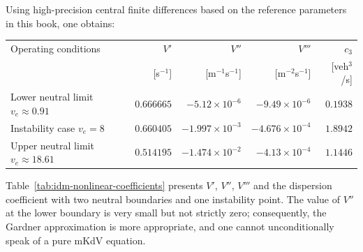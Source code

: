 \documentclass[11pt,a4paper,openany]{book}
\numberwithin{equation}{chapter}
\numberwithin{figure}{chapter}
\numberwithin{table}{chapter}
\newcommand{\tabletext}[2]{%
  \par\smallskip\noindent
  Table~\ref{#1} presents #2
\par\smallskip
}
\begin{document}
Using high-precision central finite differences based on the reference parameters in this book, one obtains:









\begin{center}
\small
{}
\label{tab:idm-nonlinear-coefficients}
\begin{tabular}{p{2.8cm}rrrr}
\toprule









Operating conditions






& $V'$ & $V''$ & $V'''$ & $c_3$ \\
 & [s$^{-1}$] & [m$^{-1}$s$^{-1}$] & [m$^{-2}$s$^{-1}$] & [veh$^3$/s] \\
\midrule









Lower neutral limit $v_e\approx0.91$






& $0.666665$ & $-5.12\times10^{-6}$ & $-9.49\times10^{-6}$ & $0.1938$ \\









Instability case $v_e=8$
& $0.660405$ & $-1.997\times10^{-3}$ & $-4.676\times10^{-4}$ & $1.8942$ \\









Upper neutral limit $v_e\approx18.61$

& $0.514195$ & $-1.474\times10^{-2}$ & $-4.13\times10^{-4}$ & $1.1446$ \\
\bottomrule
\end{tabular}
\end{center}
\tabletext{tab:idm-nonlinear-coefficients}{$V'$, $V''$, $V'''$ and the dispersion coefficient with two neutral boundaries and one instability point. The value of $V''$ at the lower boundary is very small but not strictly zero; consequently, the Gardner approximation is more appropriate, and one cannot unconditionally speak of a pure mKdV equation.


}
\end{document}
